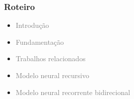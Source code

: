 \documentclass[10pt]{beamer}
\begin{document}
\begin{frame}
  \frametitle{Roteiro}


  \begin{itemize}


    
    \item[\color{gray}{$\bullet$}] \textcolor{gray}{Introdução}
    
    
    \item[\color{gray}{$\bullet$}] \textcolor{gray}{Fundamentação}


    
    \item[\color{gray}{$\bullet$}] \textcolor{gray}{Trabalhos relacionados}

    
    \item[\color{gray}{$\bullet$}] \textcolor{gray}{Modelo neural recursivo}

    
    \item[\color{gray}{$\bullet$}] \textcolor{gray}{Modelo neural recorrente bidirecional}



\end{itemize}
\end{frame}
\end{document}
